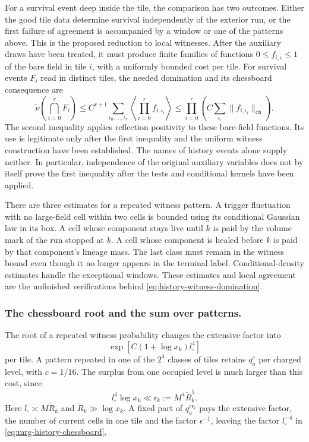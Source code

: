 \documentclass[11pt,letterpaper,reqno]{amsart}
\theoremstyle{definition}
\theoremstyle{remark}
\begin{document}
For a survival event deep inside the tile, the comparison has
two outcomes. Either the good tile data determine survival
independently of the exterior run, or the first failure of
agreement is accompanied by a window or one of the patterns
above. This is the proposed reduction to local witnesses.
After the auxiliary draws have been treated, it must produce
finite families of functions $0\le f_{i,\iota}\le1$ of the bare
field in tile $i$, with a uniformly bounded cost per tile.
For survival events $F_i$ read in distinct tiles, the needed
domination and its chessboard consequence are
\begin{equation}\label{eq:history-witness-domination}
 \widetilde\nu\!\left(\bigcap_{i=0}^r F_i\right)
 \le C^{r+1}\sum_{\iota_0,\ldots,\iota_r}
                  \left\langle\prod_{i=0}^rf_{i,\iota_i}\right\rangle
 \le\prod_{i=0}^r\left(C\sum_{\iota_i}
                                \|f_{i,\iota_i}\|_{\mathrm{ch}}\right).
\end{equation}
The second inequality applies reflection positivity to these
bare-field functions. Its use is legitimate only after the first
inequality and the uniform witness construction have been
established. The names of history events alone supply neither.
In particular, independence of the original auxiliary variables
does not by itself prove the first inequality after the tests
and conditional kernels have been applied.

There are three estimates for a repeated witness pattern.
A trigger fluctuation with no large-field cell within two cells
is bounded using its conditional Gaussian law in its box. A cell
whose component stays live until $k$ is paid by the volume mark
of the run stopped at $k$. A cell whose component is healed before
$k$ is paid by that component's lineage mass. The last class
must remain in the witness bound even though it no longer appears
in the terminal label. Conditional-density estimates handle the
exceptional windows. These estimates and local agreement are the
unfinished verifications behind
\eqref{eq:history-witness-domination}.

\subsubsection*{The chessboard root and the sum over patterns.}

The root of a repeated witness probability changes the extensive
factor into
\[
 \exp[C(1+\log x_k)l_\square^4]
\]
per tile. A pattern repeated in one of the $2^4$ classes of tiles
retains $q_a^c$ per charged level, with $c=1/16$. The surplus
from one occupied level is much larger than this cost, since
\[
 l_\square^4\log x_k\ll
          \mathsf r_k:=M^4\check R_k^5.
\]
Here $l_\square\asymp M\check R_k$ and
$\check R_k\gg\log x_k$. A fixed part of
$q_a^{c\mathsf r_k}$ pays the extensive factor, the number of
current cells in one tile and the factor $\epsilon^{-1}$, leaving
the factor $l_\square^{-4}$ in
\eqref{eq:mrg-history-chessboard}.
\end{document}
